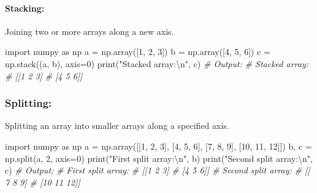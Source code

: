 \documentclass[11pt]{article}
\newenvironment{Shaded}{}{}
\newcommand{\DecValTok}[1]{\textcolor[rgb]{0.25,0.63,0.44}{{#1}}}
\newcommand{\CharTok}[1]{\textcolor[rgb]{0.25,0.44,0.63}{{#1}}}
\newcommand{\StringTok}[1]{\textcolor[rgb]{0.25,0.44,0.63}{{#1}}}
\newcommand{\CommentTok}[1]{\textcolor[rgb]{0.38,0.63,0.69}{\textit{{#1}}}}
\newcommand{\NormalTok}[1]{{#1}}
\newcommand{\ImportTok}[1]{{#1}}
\newcommand{\OperatorTok}[1]{\textcolor[rgb]{0.40,0.40,0.40}{{#1}}}
\newcommand{\BuiltInTok}[1]{{#1}}
\begin{document}
\hypertarget{stacking}{%
\paragraph{Stacking:}\label{stacking}}

Joining two or more arrays along a new axis.

\begin{Shaded}
\begin{Highlighting}[]
\ImportTok{import}\NormalTok{ numpy }\ImportTok{as}\NormalTok{ np}
\NormalTok{a }\OperatorTok{=}\NormalTok{ np.array([}\DecValTok{1}\NormalTok{, }\DecValTok{2}\NormalTok{, }\DecValTok{3}\NormalTok{])}
\NormalTok{b }\OperatorTok{=}\NormalTok{ np.array([}\DecValTok{4}\NormalTok{, }\DecValTok{5}\NormalTok{, }\DecValTok{6}\NormalTok{])}
\NormalTok{c }\OperatorTok{=}\NormalTok{ np.stack((a, b), axis}\OperatorTok{=}\DecValTok{0}\NormalTok{)}
\BuiltInTok{print}\NormalTok{(}\StringTok{"Stacked array:}\CharTok{\textbackslash{}n}\StringTok{"}\NormalTok{, c)}
\CommentTok{\# Output:}
\CommentTok{\# Stacked array:}
\CommentTok{\#  [[1 2 3]}
\CommentTok{\#   [4 5 6]]}
\end{Highlighting}
\end{Shaded}

\hypertarget{splitting}{%
\subsubsection{Splitting:}\label{splitting}}

Splitting an array into smaller arrays along a specified axis.

\begin{Shaded}
\begin{Highlighting}[]
\ImportTok{import}\NormalTok{ numpy }\ImportTok{as}\NormalTok{ np}
\NormalTok{a }\OperatorTok{=}\NormalTok{ np.array([[}\DecValTok{1}\NormalTok{, }\DecValTok{2}\NormalTok{, }\DecValTok{3}\NormalTok{], [}\DecValTok{4}\NormalTok{, }\DecValTok{5}\NormalTok{, }\DecValTok{6}\NormalTok{], [}\DecValTok{7}\NormalTok{, }\DecValTok{8}\NormalTok{, }\DecValTok{9}\NormalTok{], [}\DecValTok{10}\NormalTok{, }\DecValTok{11}\NormalTok{, }\DecValTok{12}\NormalTok{]])}
\NormalTok{b, c }\OperatorTok{=}\NormalTok{ np.split(a, }\DecValTok{2}\NormalTok{, axis}\OperatorTok{=}\DecValTok{0}\NormalTok{)}
\BuiltInTok{print}\NormalTok{(}\StringTok{"First split array:}\CharTok{\textbackslash{}n}\StringTok{"}\NormalTok{, b)}
\BuiltInTok{print}\NormalTok{(}\StringTok{"Second split array:}\CharTok{\textbackslash{}n}\StringTok{"}\NormalTok{, c)}
\CommentTok{\# Output:}
\CommentTok{\# First split array:}
\CommentTok{\#  [[1 2 3]}
\CommentTok{\#   [4 5 6]]}
\CommentTok{\# Second split array:}
\CommentTok{\#  [[ 7  8  9]}
\CommentTok{\#   [10 11 12]]}
\end{Highlighting}
\end{Shaded}
\end{document}
